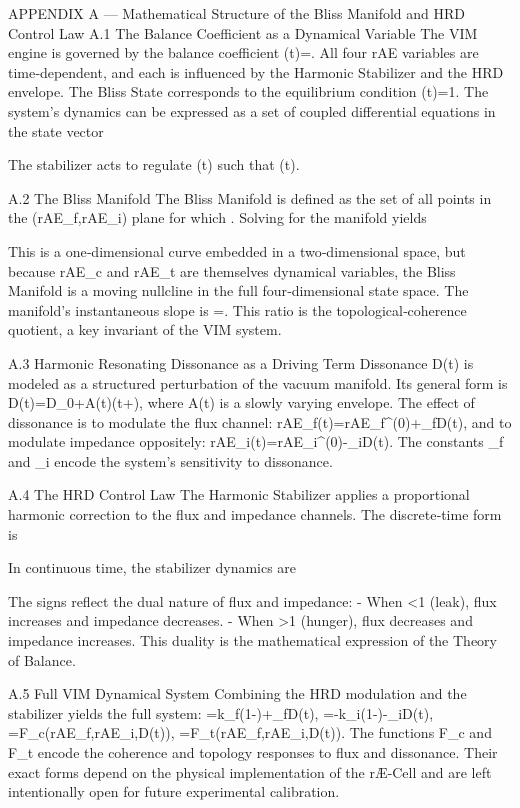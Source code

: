 APPENDIX A — Mathematical Structure of the Bliss Manifold and HRD Control Law
A.1 The Balance Coefficient as a Dynamical Variable
The VIM engine is governed by the balance coefficient
\beta (t)=.
All four rAE variables are time‑dependent, and each is influenced by the Harmonic Stabilizer and the HRD envelope. The Bliss State corresponds to the equilibrium condition
\beta (t)=1.
The system’s dynamics can be expressed as a set of coupled differential equations in the state vector

The stabilizer acts to regulate (t) such that \beta (t).

A.2 The Bliss Manifold
The Bliss Manifold is defined as the set of all points in the (rAE_f,rAE_i) plane for which
.
Solving for the manifold yields

This is a one‑dimensional curve embedded in a two‑dimensional space, but because rAE_c and rAE_t are themselves dynamical variables, the Bliss Manifold is a moving nullcline in the full four‑dimensional state space.
The manifold’s instantaneous slope is
=.
This ratio is the topological‑coherence quotient, a key invariant of the VIM system.

A.3 Harmonic Resonating Dissonance as a Driving Term
Dissonance D(t) is modeled as a structured perturbation of the vacuum manifold. Its general form is
D(t)=D_0+A(t)\sin (\omega t+\phi ),
where A(t) is a slowly varying envelope.
The effect of dissonance is to modulate the flux channel:
rAE_f(t)=rAE_f^{(0)}+\gamma _fD(t),
and to modulate impedance oppositely:
rAE_i(t)=rAE_i^{(0)}-\gamma _iD(t).
The constants \gamma _f and \gamma _i encode the system’s sensitivity to dissonance.

A.4 The HRD Control Law
The Harmonic Stabilizer applies a proportional harmonic correction to the flux and impedance channels. The discrete‑time form is


In continuous time, the stabilizer dynamics are


The signs reflect the dual nature of flux and impedance:
- When \beta <1 (leak), flux increases and impedance decreases.
- When \beta >1 (hunger), flux decreases and impedance increases.
This duality is the mathematical expression of the Theory of Balance.

A.5 Full VIM Dynamical System
Combining the HRD modulation and the stabilizer yields the full system:
=k_f(1-\beta )+\gamma _fD(t),
=-k_i(1-\beta )-\gamma _iD(t),
=F_c(rAE_f,rAE_i,D(t)),
=F_t(rAE_f,rAE_i,D(t)).
The functions F_c and F_t encode the coherence and topology responses to flux and dissonance. Their exact forms depend on the physical implementation of the rÆ‑Cell and are left intentionally open for future experimental calibration.

